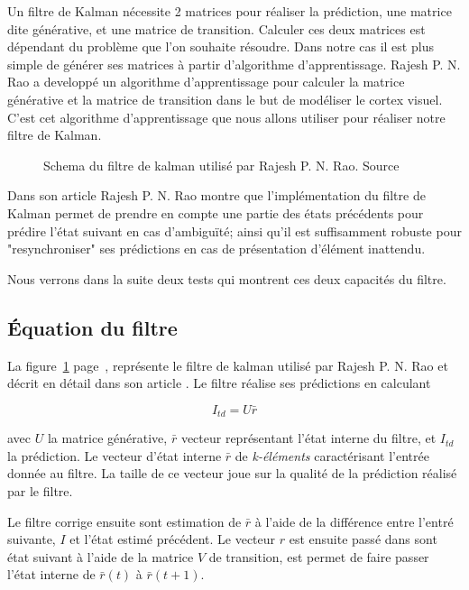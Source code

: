 Un filtre de Kalman nécessite 2 matrices pour réaliser la prédiction, une
matrice dite générative, et une matrice de transition\cite{Rao1999}. Calculer
ces deux matrices est dépendant du problème que l'on souhaite résoudre. Dans
notre cas il est plus simple de générer ses matrices à partir d'algorithme
d'apprentissage. Rajesh P. N. Rao a developpé un algorithme d'apprentissage
pour calculer la matrice générative et la matrice de transition dans le but de
modéliser le cortex visuel\cite{Rao1999}. C'est cet algorithme d'apprentissage
que nous allons utiliser pour réaliser notre filtre de Kalman.

\begin{figure}[ht]
   \begin{center}
   \end{center}
   \caption[Schema du filtre de kalman]{Schema du filtre de kalman utilisé par
   Rajesh P. N. Rao. Source \cite{Rao1999}}
   \label{fig:filtre_kalman}
\end{figure}

Dans son article\cite{Rao1999} Rajesh P. N. Rao montre que l'implémentation du
filtre de Kalman permet de prendre en compte une partie des états précédents
pour prédire l'état suivant en cas d'ambiguïté; ainsi qu'il est suffisamment
robuste pour "resynchroniser" ses prédictions en cas de présentation d'élément
inattendu.

Nous verrons dans la suite deux tests qui montrent ces deux capacités du filtre.

\subsection{Équation du filtre} %
\label{sub:Équation du filtre}

La figure~\ref{fig:filtre_kalman} page~\pageref{fig:filtre_kalman}, représente
le filtre de kalman utilisé par Rajesh P. N. Rao et décrit en détail dans son
article \cite{Rao1999}. Le filtre réalise ses prédictions en calculant

\[ I_{td} = U\bar{r} \]

avec $U$ la matrice générative, $\bar{r}$ vecteur représentant l'état interne
du filtre, et $I_{td}$ la prédiction. Le vecteur d'état interne $\bar{r}$ de
\textit{k-éléments} caractérisant l'entrée donnée au filtre. La taille de ce
vecteur joue sur la qualité de la prédiction réalisé par le filtre.

Le filtre corrige ensuite sont estimation de $\bar{r}$ à l'aide de la
différence entre l'entré suivante, $I$ et l'état estimé précédent. Le vecteur
$r$ est ensuite passé dans sont état suivant à l'aide de la matrice $V$ de
transition, est permet de faire passer l'état interne de $\bar{r}(t)$ à
$\bar{r}(t+1)$.\\

